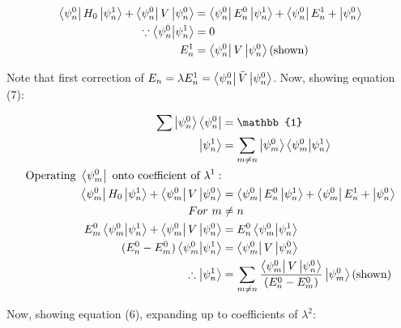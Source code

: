 \documentclass{article}
\begin{document}
\begin{flushleft}
\begin{align*}
    \bra{\psi_n^0}H_0\ket{\psi_n^1}+\bra{\psi_n^0}V\ket{\psi_n^0}&=\bra{\psi_n^0}E_n^0\ket{\psi_n^1}+\bra{\psi_n^0}E_n^1+\ket{\psi_n^0}\\
    \because \bra{\psi_n^0}\ket{\psi_n^1}&=0\\
    E_n^1&=\bra{\psi_n^0}V\ket{\psi_n^0}\text{(shown)}
\end{align*}

Note that first correction of $E_n=\lambda E_n^1=\bra{\psi_n^0}\bar{V}\ket{\psi_n^0}$. Now, showing equation (7):

\begin{align*}
    \sum\ket{\psi_n^0}\bra{\psi_n^0}&=\mathbb{1}\\
    \ket{\psi_n^1}&=\sum_{m\neq n}\ket{\psi_m^0}\bra{\psi_m^0}\ket{\psi_n^1}\\
    \text{Operating}\ \bra{\psi_m^0}\ \text{onto coefficient of}\ \lambda^1:\\
    \bra{\psi_m^0}H_0\ket{\psi_n^1}+\bra{\psi_m^0}V\ket{\psi_n^0}&=\bra{\psi_m^0}E_n^0\ket{\psi_n^1}+\bra{\psi_m^0}E_n^1+\ket{\psi_n^0}\\
    For\ m&\neq n\\
    E_m^0\bra{\psi_m^0}\ket{\psi_n^1}+\bra{\psi_m^0}V\ket{\psi_n^0}&=E_n^0\bra{\psi_m^0}\ket{\psi_n^1}\\
    (E_n^0-E_m^0)\bra{\psi_m^0}\ket{\psi_n^1}&=\bra{\psi_m^0}V\ket{\psi_n^0}\\
    \therefore \ket{\psi_n^1}&=\sum_{m\neq n}\frac{\bra{\psi_m^0}V\ket{\psi_n^0}}{(E_n^0-E_m^0)}\ket{\psi_m^0}\text{(shown)}
\end{align*}

Now, showing equation (6), expanding up to coefficients of $\lambda^2$:


\end{flushleft}
\end{document}
